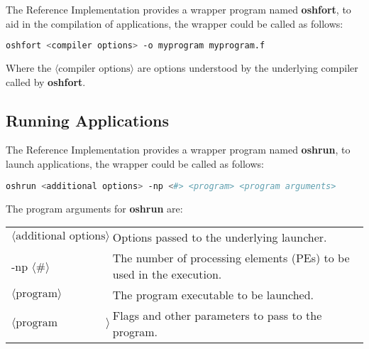 The  \openshmem{} Reference Implementation provides a wrapper program named \textbf{oshfort}, to aid in the compilation of \Fortran{} applications,
the wrapper could be called as follows:

\begin{lstlisting}[language=bash]
oshfort <compiler options> -o myprogram myprogram.f
\end{lstlisting}
Where the $\langle\mbox{compiler options}\rangle$ are options understood by the underlying \Fortran{} compiler called by \textbf{oshfort}.

\subsection{Running Applications}

The  \openshmem{} Reference Implementation provides a wrapper program named \textbf{oshrun}, to launch \openshmem applications, the wrapper could
be called as follows:

\begin{lstlisting}[language=bash]
oshrun <additional options> -np <#> <program> <program arguments>
\end{lstlisting}
The program arguments for \textbf{oshrun} are:

\begin{tabular}{p{}p{}}
$\langle\mbox{additional options}\rangle$ & {Options passed to the underlying launcher.}\tabularnewline
-np $\langle\mbox{\#}\rangle$ & {The number of processing elements (PEs) to be used in the execution.}\tabularnewline
$\langle\mbox{program}\rangle$ & {The program executable to be launched.}\tabularnewline
$\langle\mbox{program arguments}\rangle$ & {Flags and other parameters to pass to the program.}\tabularnewline
\end{tabular}

